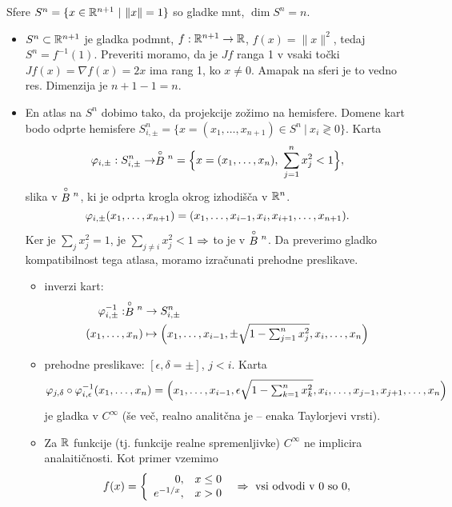 \pagebreak
\begin{zgled}
	Sfere $S^n = \{x \in \mathbb{R}^{n+1}\ |\ \|x\| = 1\}$ so gladke mnt, $\dim S^n = n$.
	\begin{itemize}
		\item{$S^n \subset \mathbb{R}^{n+1}$ je gladka podmnt, $f : \mathbb{R}^{n+1} \to \mathbb{R}$, $f(x) = \|x\|^2$, tedaj $S^n = f^{-1}(1)$. Preveriti moramo,
			da je $Jf$ ranga 1 v vsaki to\v cki $Jf(x) = \nabla f(x) = 2x$ ima rang 1, ko $x \neq 0$. Amapak na sferi je to vedno res.
			Dimenzija je $n + 1 - 1 = n$.}
		\item{En atlas na $S^n$ dobimo tako, da projekcije zo\v zimo na hemisfere. Domene kart bodo odprte hemisfere $S^n_{i,\pm} =
			\big\{x = (x_1,\ldots,x_{n+1}) \in S^n\ \big|\ x_i \gtrless 0\big\}$. Karta
			\[
				\varphi_{i,\pm} : S^n_{i,\pm} \to \stackrel{\circ}{B}{}^n = \Big\{x = (x_1, \ldots, x_n),\ \sum_{j = 1}^n x^2_j < 1\Big\},
			\]
			slika v $\stackrel{\circ}{B}{}^n$, ki je odprta krogla okrog izhodi\v s\v ca v $\mathbb{R}^n$. 
			\[
				\varphi_{i,\pm} (x_1, \ldots, x_{n+1}) = (x_1, \ldots, x_{i-1}, x_i, x_{i+1},\ldots,x_{n+1}).
			\]
			Ker je $\sum_j x_j^2 = 1$, je $\sum_{j \neq i} x_j^2 < 1$ $\Rightarrow$ to je v $\stackrel{\circ}{B}{}^n$. Da preverimo
			gladko kompatibilnost tega atlasa, moramo izra\v cunati prehodne preslikave.
			\begin{itemize}
				\item{inverzi kart:
					\begin{align*}
						\varphi^{-1}_{i, \pm} : \stackrel{\circ}{B}{}^n & \to S^n_{i,\pm} \\
						(x_1,\ldots,x_n) &\mapsto \Big(x_1,\ldots,x_{i-1}, \pm\sqrt{1 - \textstyle{\sum_{j=1}^n x_j^2}}, x_i,
							\ldots, x_n\Big)
					\end{align*}}
				\item{prehodne preslikave: $[\epsilon, \delta = \pm]$, $j < i$. Karta
					\[
						\varphi_{j,\delta} \circ \varphi^{-1}_{i,\epsilon} (x_1,\ldots,x_n) = \Big(x_1, \ldots, x_{i-1},
							\epsilon\sqrt{1 - \textstyle{\sum_{k = 1}^n x_k^2}}, x_i, \ldots, x_{j-1}, x_{j+1}, \ldots, x_n\Big)
					\] je gladka v $C^\infty$ (\v se ve\v c, realno analit\v cna je -- enaka Taylorjevi vrsti).}
				\item{Za $\mathbb{R}$ funkcije (tj. funkcije realne spremenljivke) $C^\infty$ ne implicira analaiti\v cnosti. Kot primer vzemimo
					\[
						f(x) = \left\{
						\begin{array}{rl}
							0, & x \leq 0 \\
							e^{-1/x}, & x > 0
						\end{array}\right. {}\ \Rightarrow\ \text{vsi odvodi v 0 so 0},
\]}
\end{itemize}}
\end{itemize}
\end{zgled}
